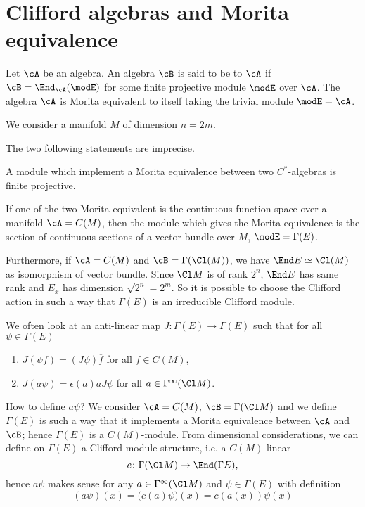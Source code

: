 \section{Clifford algebras and Morita equivalence}

Let $\cA$ be an algebra. An algebra $\cB$ is said to be \label{PgMoritaEq} to $\cA$ if $\cB=\End_{\cA}(\modE)$ for some finite projective module $\modE$ over $\cA$. The algebra $\cA$ is Morita equivalent to itself taking the trivial module $\modE=\cA$.

We consider a manifold $M$ of dimension $n=2m$.

\begin{probleme}
	The two following statements are imprecise.
\end{probleme}

\begin{proposition}
	A module which implement a Morita equivalence between two $C^*$-algebras is finite projective.
\end{proposition}

\begin{theorem}
	If one of the two Morita equivalent is the continuous function space over a manifold $\cA=C(M)$, then the module which gives the Morita equivalence is the section of continuous sections of a vector bundle over $M$, $\modE=\Gamma(E)$.
\end{theorem}
Furthermore, if $\cA=C(M)$ and $\cB=\Gamma(\Cl(M))$, we have $\End E\simeq \Cl(M)$ as isomorphism of vector bundle. Since $\Cl M$ is of rank $2^n$, $\End E$ has same rank and $E_x$ has dimension $\sqrt{2^n}=2^m$. So it is possible to choose the Clifford action in such a way that $\Gamma(E)$ is an irreducible Clifford module.

We often look at an anti-linear map $J\colon \Gamma(E)\to \Gamma(E)$ such that for all $\psi\in\Gamma(E)$
\begin{enumerate}
	\item $J(\psi f)=(J\psi)\overline{ f }$ for all $f\in C(M)$,
	\item $J(a\psi)=\epsilon(a)a J\psi$ for all $a\in\Gamma^{\infty}(\Cl M)$.
\end{enumerate}
How to define $a\psi$? We consider $\cA=C(M)$, $\cB=\Gamma(\Cl M)$ and we define $\Gamma(E)$ is such a way that it implements a Morita equivalence between $\cA$ and $\cB$; hence $\Gamma(E)$ is a $C(M)$-module. From dimensional considerations, we can define on $\Gamma(E)$ a Clifford module structure, i.e. a $C(M)$-linear
\begin{equation}
	c\colon \Gamma(\Cl M)\to \End(\Gamma E),
\end{equation}
hence $a\psi$ makes sense for any $a\in\Gamma^{\infty}(\Cl M)$ and $\psi\in\Gamma(E)$ with definition
\begin{equation}
	(a\psi)(x)=\big( c(a)\psi \big)(x)
	=c(a(x))\psi(x)
\end{equation}

